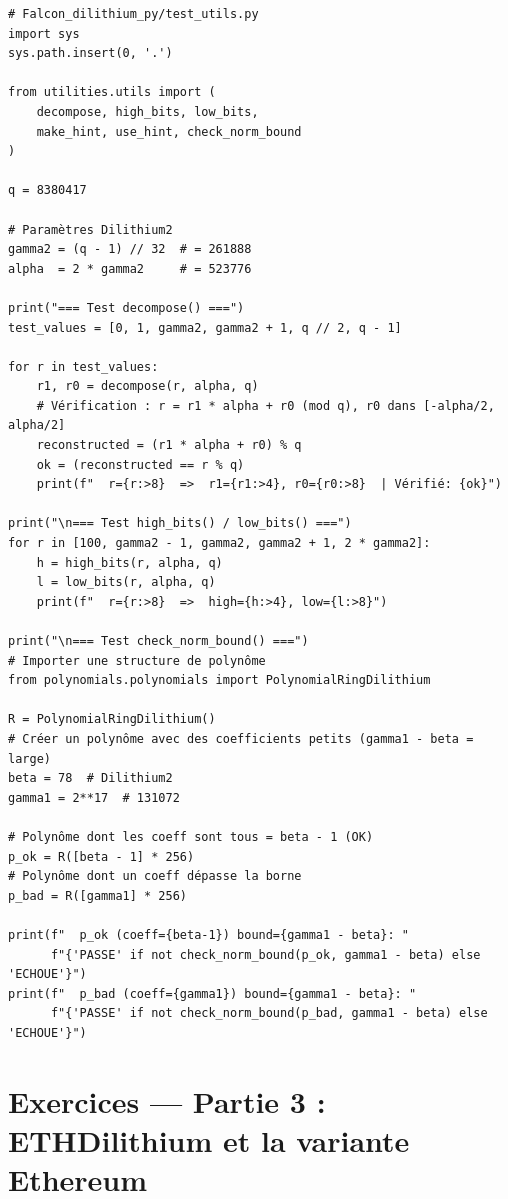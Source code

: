 \documentclass[12pt, a4paper]{article}
\begin{document}
\begin{solution}
\begin{lstlisting}[style=python]
# Falcon_dilithium_py/test_utils.py
import sys
sys.path.insert(0, '.')

from utilities.utils import (
    decompose, high_bits, low_bits,
    make_hint, use_hint, check_norm_bound
)

q = 8380417

# Paramètres Dilithium2
gamma2 = (q - 1) // 32  # = 261888
alpha  = 2 * gamma2     # = 523776

print("=== Test decompose() ===")
test_values = [0, 1, gamma2, gamma2 + 1, q // 2, q - 1]

for r in test_values:
    r1, r0 = decompose(r, alpha, q)
    # Vérification : r = r1 * alpha + r0 (mod q), r0 dans [-alpha/2, alpha/2]
    reconstructed = (r1 * alpha + r0) % q
    ok = (reconstructed == r % q)
    print(f"  r={r:>8}  =>  r1={r1:>4}, r0={r0:>8}  | Vérifié: {ok}")

print("\n=== Test high_bits() / low_bits() ===")
for r in [100, gamma2 - 1, gamma2, gamma2 + 1, 2 * gamma2]:
    h = high_bits(r, alpha, q)
    l = low_bits(r, alpha, q)
    print(f"  r={r:>8}  =>  high={h:>4}, low={l:>8}")

print("\n=== Test check_norm_bound() ===")
# Importer une structure de polynôme
from polynomials.polynomials import PolynomialRingDilithium

R = PolynomialRingDilithium()
# Créer un polynôme avec des coefficients petits (gamma1 - beta = large)
beta = 78  # Dilithium2
gamma1 = 2**17  # 131072

# Polynôme dont les coeff sont tous = beta - 1 (OK)
p_ok = R([beta - 1] * 256)
# Polynôme dont un coeff dépasse la borne
p_bad = R([gamma1] * 256)

print(f"  p_ok (coeff={beta-1}) bound={gamma1 - beta}: "
      f"{'PASSE' if not check_norm_bound(p_ok, gamma1 - beta) else 'ECHOUE'}")
print(f"  p_bad (coeff={gamma1}) bound={gamma1 - beta}: "
      f"{'PASSE' if not check_norm_bound(p_bad, gamma1 - beta) else 'ECHOUE'}")
\end{lstlisting}
\end{solution}

\newpage
\section{Exercices --- Partie 3 : ETHDilithium et la variante Ethereum}
\end{document}
